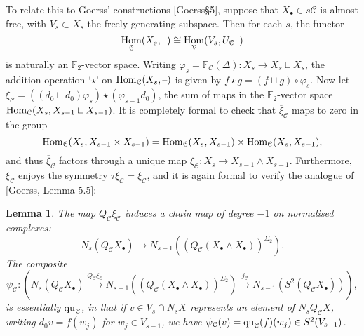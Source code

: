 \documentclass[11pt]{amsart}
\theoremstyle{plain}
\newtheorem{lem}[thm]{Lemma}
\theoremstyle{definition}
\DeclareMathOperator{\Hom}{Hom}
\newcommand{\DASH}{\textup{--}}
\let\phi\varphi
\renewcommand{\to}{\longrightarrow}
\newcommand{\calC}{\mathcal{C}}
\newcommand{\calV}{\mathcal{V}}
\theoremstyle{plain}
\newcommand{\quadratic}{\textup{qu}}
\newcommand{\F}{\mathbb{F}}
\begin{document}
\begin{Conventions and notation}
To relate this to Goerss' constructions [Goerss\S5], suppose that $X_\bullet\in s\calC$ is almost free, with $V_s\subset X_s$ the freely generating subspace. Then for each $s$, the functor 
\[\Hom_\calC(X_s,\DASH)\cong \Hom_\calV(V_s,U_\calC\DASH)\]
is naturally an $\F_2$-vector space. Writing $\phi_s=\F_\calC(\Delta):X_s\to X_s\sqcup X_s$, the addition operation `$\star$' on $\Hom_\calC(X_s,\DASH)$ is given by $f\star g= (f\sqcup g)\circ\phi_s$. Now let
$\overline{\xi}_\calC=((d_0\sqcup d_0)\phi_s)\star(\phi_{s-1}d_0)$, the sum of maps in the $\F_2$-vector space $\textup{Hom}_\calC(X_s,X_{s-1}\sqcup X_{s-1})$. It is completely formal to check that $\overline{\xi}_\calC$ maps to zero in the group
\[\textup{Hom}_\calC(X_s,X_{s-1}\times X_{s-1})=\textup{Hom}_\calC(X_s,X_{s-1})\times \textup{Hom}_\calC(X_s,X_{s-1}),\]
and thus $\overline{\xi}_\calC$ factors through a unique map $\xi_\calC:X_s\to X_{s-1}\wedge X_{s-1}$. Furthermore, $\xi_\calC$ enjoys the symmetry $\tau\xi_\calC=\xi_\calC$, and it is again formal to verify the analogue of [Goerss, Lemma 5.5]:
\begin{lem}
The map $Q_\calC\xi_\calC$ induces a chain map of degree $-1$ on normalised complexes:
\[N_s(Q_{\calC}X_\bullet)\to N_{s-1}((Q_{\calC}(X_\bullet\wedge X_\bullet))^{\Sigma_2}).\]
The composite
\[\psi_\calC:\left(N_s(Q_{\calC}X_\bullet)\overset{Q_\calC\xi_\calC}{\to} N_{s-1}((Q_{\calC}(X_\bullet\wedge X_\bullet))^{\Sigma_2})\overset{j_\calC}{\to} N_{s-1}(S^2(Q_{\calC}X_\bullet))\right),\]
is essentially $\quadratic_\calC$, in that if $v\in V_s\cap N_sX$ represents an element of $N_sQ_\calC X$, writing $d_0v=f(w_j)$ for $w_j\in V_{s-1}$, we have $\psi_\calC(v)=\quadratic_\calC(f)(w_j)\in S^2(V_{s-1})$.
\end{lem}

\end{Conventions and notation}
\end{document}
